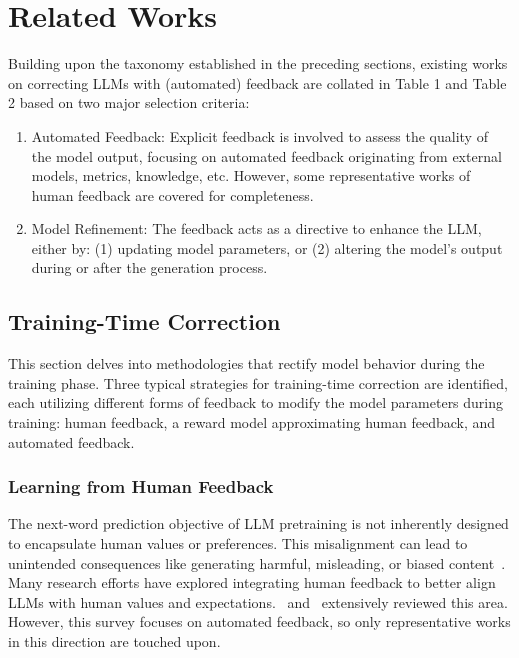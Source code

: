 \documentclass[12pt]{extarticle}
\begin{document}
\section{Related Works}
Building upon the taxonomy established in the preceding sections, existing works on correcting LLMs with (automated) feedback are collated in Table 1 and Table 2 based on two major selection criteria:

\begin{enumerate}
    \item Automated Feedback: Explicit feedback is involved to assess the quality of the model output, focusing on automated feedback originating from external models, metrics, knowledge, etc. However, some representative works of human feedback are covered for completeness.

    \item Model Refinement: The feedback acts as a directive to enhance the LLM, either by: (1) updating model parameters, or (2) altering the model's output during or after the generation process.
\end{enumerate}

\subsection{Training-Time Correction}
This section delves into methodologies that rectify model behavior during the training phase. Three typical strategies for training-time correction are identified, each utilizing different forms of feedback to modify the model parameters during training: human feedback, a reward model approximating human feedback, and automated feedback.

\subsubsection{Learning from Human Feedback}
The next-word prediction objective of LLM pretraining is not inherently designed to encapsulate human values or preferences. This misalignment can lead to unintended consequences like generating harmful, misleading, or biased content~\cite{kenton2021alignment}. Many research efforts have explored integrating human feedback to better align LLMs with human values and expectations.~\cite{wang2023aligning} and~\cite{fernandes2023bridging} extensively reviewed this area. However, this survey focuses on automated feedback, so only representative works in this direction are touched upon.
\end{document}
